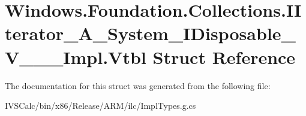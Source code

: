 \hypertarget{struct_windows_1_1_foundation_1_1_collections_1_1_i_iterator___a___system___i_disposable___v_______impl_1_1_vtbl}{}\section{Windows.\+Foundation.\+Collections.\+I\+Iterator\+\_\+\+A\+\_\+\+System\+\_\+\+I\+Disposable\+\_\+\+V\+\_\+\+\_\+\+\_\+\+Impl.\+Vtbl Struct Reference}
\label{struct_windows_1_1_foundation_1_1_collections_1_1_i_iterator___a___system___i_disposable___v_______impl_1_1_vtbl}


The documentation for this struct was generated from the following file\+:\begin{DoxyCompactItemize}
\item 
I\+V\+S\+Calc/bin/x86/\+Release/\+A\+R\+M/ilc/Impl\+Types.\+g.\+cs\end{DoxyCompactItemize}
